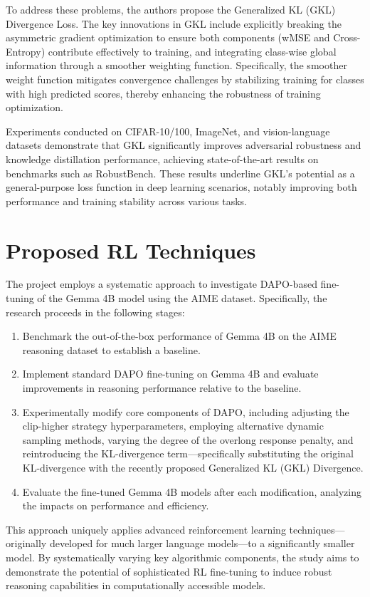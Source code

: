 \documentclass[11pt, oneside]{article}   	%
\begin{document}
To address these problems, the authors propose the Generalized KL (GKL) Divergence Loss. The key innovations in GKL include explicitly breaking the asymmetric gradient optimization to ensure both components (wMSE and Cross-Entropy) contribute effectively to training, and integrating class-wise global information through a smoother weighting function. Specifically, the smoother weight function mitigates convergence challenges by stabilizing training for classes with high predicted scores, thereby enhancing the robustness of training optimization.

Experiments conducted on CIFAR-10/100, ImageNet, and vision-language datasets demonstrate that GKL significantly improves adversarial robustness and knowledge distillation performance, achieving state-of-the-art results on benchmarks such as RobustBench. These results underline GKL’s potential as a general-purpose loss function in deep learning scenarios, notably improving both performance and training stability across various tasks.


\section*{Proposed RL Techniques}

The project employs a systematic approach to investigate DAPO-based fine-tuning of the Gemma 4B model using the AIME dataset. Specifically, the research proceeds in the following stages:

\begin{enumerate}
\item Benchmark the out-of-the-box performance of Gemma 4B on the AIME reasoning dataset to establish a baseline.
\item Implement standard DAPO fine-tuning on Gemma 4B and evaluate improvements in reasoning performance relative to the baseline.
\item Experimentally modify core components of DAPO, including adjusting the clip-higher strategy hyperparameters, employing alternative dynamic sampling methods, varying the degree of the overlong response penalty, and reintroducing the KL-divergence term—specifically substituting the original KL-divergence with the recently proposed Generalized KL (GKL) Divergence.
\item Evaluate the fine-tuned Gemma 4B models after each modification, analyzing the impacts on performance and efficiency.
\end{enumerate}

This approach uniquely applies advanced reinforcement learning techniques—originally developed for much larger language models—to a significantly smaller model. By systematically varying key algorithmic components, the study aims to demonstrate the potential of sophisticated RL fine-tuning to induce robust reasoning capabilities in computationally accessible models.
\end{document}
